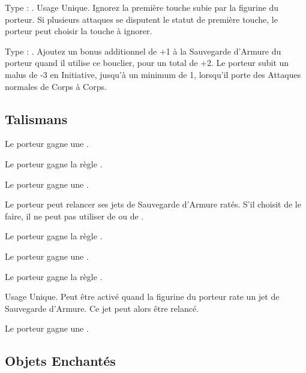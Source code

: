 Type : \shield{}. Usage Unique. Ignorez la première touche subie par la figurine du porteur. Si plusieurs attaques se disputent le statut de première touche, le porteur peut choisir la touche à ignorer.

Type : \shield{}. Ajoutez un bonus additionnel de +1 à la Sauvegarde d'Armure du porteur quand il utilise ce bouclier, pour un total de +2. Le porteur subit un malus de -3 en Initiative, jusqu'à un minimum de 1, lorsqu'il porte des Attaques normales de Corps à Corps.

\endpricelist

\newpage
\hypertarget{talismans}{\subsection{Talismans}}
\label{talismans}

\startpricelist

Le porteur gagne une .

Le porteur gagne la règle .

Le porteur gagne une .

Le porteur peut relancer ses jets de Sauvegarde d'Armure ratés. S'il choisit de le faire, il ne peut pas utiliser de \wardsave{} ou de \regeneration{}.

Le porteur gagne la règle .

\columnbreak

Le porteur gagne une .

Le porteur gagne la règle \fireborn{}.

Usage Unique. Peut être activé quand la figurine du porteur rate un jet de Sauvegarde d'Armure. Ce jet peut alors être relancé.

Le porteur gagne une .

\endpricelist

\newpage
\hypertarget{enchanteditems}{\subsection{Objets Enchantés}}
\label{enchanted_items}

